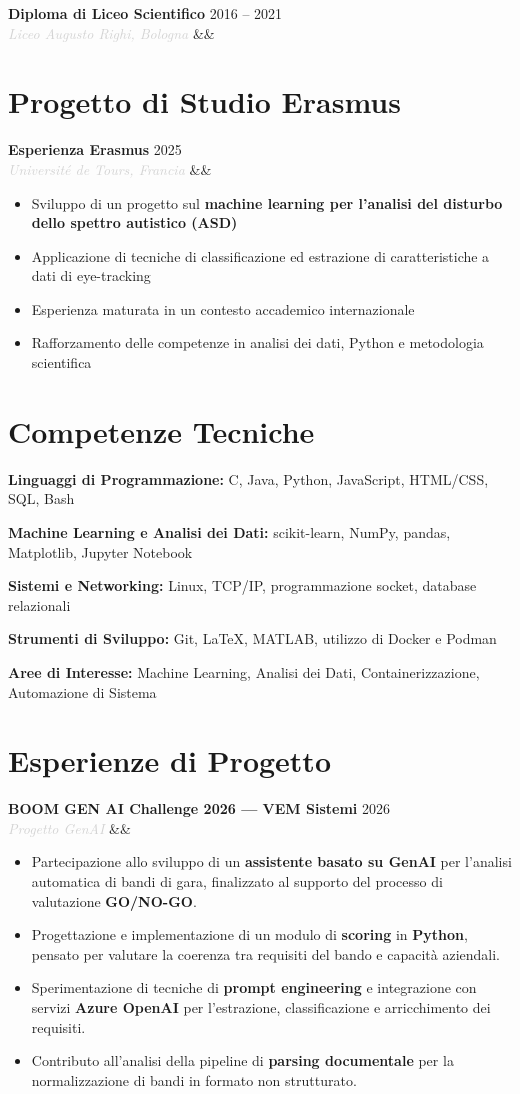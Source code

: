 \documentclass[a4paper,10pt]{article}
\newcommand{\entry}[4]{%
  \noindent\textbf{#1} \hfill \textcolor{accent}{#2}\\
  \textit{\textcolor{lightgray}{#3}}%
  \ifx&#4&\else\\\vspace{0.2em}#4\fi
  \vspace{0.5em}
}
\newcommand{\entrylist}[5]{%
  \noindent\textbf{#1} \hfill \textcolor{accent}{#2}\\
  \textit{\textcolor{lightgray}{#3}}%
  \ifx&#4&\else\\\vspace{0.2em}#4\fi
  \vspace{0.3em}
  \begin{itemize}#5\end{itemize}
  \vspace{0.3em}
}
\newcommand{\skillgroup}[2]{%
  \noindent\textbf{#1:} #2\par\vspace{0.35em}
}
\begin{document}
\entry{Diploma di Liceo Scientifico}{2016 -- 2021}{Liceo Augusto Righi, Bologna}{}

\section{Progetto di Studio Erasmus}

\entrylist{Esperienza Erasmus}{2025}{Université de Tours, Francia}{}{
  \item Sviluppo di un progetto sul \textbf{machine learning per l’analisi del disturbo dello spettro autistico (ASD)}
  \item Applicazione di tecniche di classificazione ed estrazione di caratteristiche a dati di eye-tracking
  \item Esperienza maturata in un contesto accademico internazionale
  \item Rafforzamento delle competenze in analisi dei dati, Python e metodologia scientifica
}

\section{Competenze Tecniche}

\skillgroup{Linguaggi di Programmazione}{C, Java, Python, JavaScript, HTML/CSS, SQL, Bash}
\skillgroup{Machine Learning e Analisi dei Dati}{scikit-learn, NumPy, pandas, Matplotlib, Jupyter Notebook}
\skillgroup{Sistemi e Networking}{Linux, TCP/IP, programmazione socket, database relazionali}
\skillgroup{Strumenti di Sviluppo}{Git, \LaTeX, MATLAB, utilizzo di Docker e Podman}
\skillgroup{Aree di Interesse}{Machine Learning,
                               Analisi dei Dati,
                               Containerizzazione, Automazione di Sistema}

\section{Esperienze di Progetto}

\entrylist{BOOM GEN AI Challenge 2026 — VEM Sistemi}{2026}{Progetto GenAI}{}{
  \item Partecipazione allo sviluppo di un \textbf{assistente basato su GenAI} per l'analisi automatica di bandi di gara, finalizzato al supporto del processo di valutazione \textbf{GO/NO-GO}.
  \item Progettazione e implementazione di un modulo di \textbf{scoring} in \textbf{Python}, pensato per valutare la coerenza tra requisiti del bando e capacità aziendali.
  \item Sperimentazione di tecniche di \textbf{prompt engineering} e integrazione con servizi \textbf{Azure OpenAI} per l'estrazione, classificazione e arricchimento dei requisiti.
  \item Contributo all'analisi della pipeline di \textbf{parsing documentale} per la normalizzazione di bandi in formato non strutturato.
}
\end{document}
